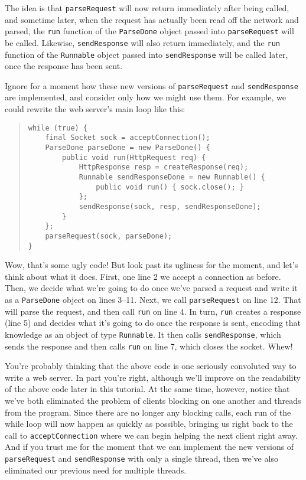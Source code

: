 \documentclass[11pt]{article}
\begin{document}
The idea is that \texttt{parseRequest} will now return immediately after
being called, and sometime later, when the request has actually been
read off the network and parsed, the \texttt{run} function of the
\texttt{ParseDone} object passed into \texttt{parseRequest} will be
called.  Likewise, \texttt{sendResponse} will also return immediately,
and the \texttt{run} function of the \texttt{Runnable} object passed
into \texttt{sendResponse} will be called later, once the response has
been sent.  

Ignore for a moment how these new versions of \texttt{parseRequest} and
\texttt{sendResponse} are implemented, and consider only how we might
use them.  For example, we could rewrite the web server's main loop like
this:

\begin{quote}
\lstset{language=Java, basicstyle=\small, numbers=left, numberstyle=\tiny, 
        numberfirstline=true, stepnumber=1, numbersep=5pt}
\begin{lstlisting}  
while (true) {
    final Socket sock = acceptConnection();
    ParseDone parseDone = new ParseDone() {
        public void run(HttpRequest req) {
            HttpResponse resp = createResponse(req);
            Runnable sendResponseDone = new Runnable() {
                public void run() { sock.close(); }
            };
            sendResponse(sock, resp, sendResponseDone);
        }
    };
    parseRequest(sock, parseDone);
}
\end{lstlisting}
\end{quote}

Wow, that's some ugly code!  But look past its ugliness for the moment,
and let's think about what it does.  First, one line 2 we accept a
connection as before.  Then, we decide what we're going to do once we've
parsed a request and write it as a \texttt{ParseDone} object on lines
3--11.  Next, we call \texttt{parseRequest} on line 12.  That will parse
the request, and then call \texttt{run} on line 4.  In turn,
\texttt{run} creates a response (line 5) and decides what it's going to
do once the response is sent, encoding that knowledge as an object of
type \texttt{Runnable}.  It then calls \texttt{sendResponse}, which
sends the response and then calls \texttt{run} on line 7, which closes
the socket.  Whew!

You're probably thinking that the above code is one seriously convoluted
way to write a web server.  In part you're right, although we'll
improve on the readability of the above code later in this tutorial.  At
the same time, however, notice that we've both eliminated the problem of
clients blocking on one another and threads from the program.  Since
there are no longer any blocking calls, each run of the while loop will
now happen as quickly as possible, bringing us right back to the call to
\texttt{acceptConnection} where we can begin helping the next client
right away.  And if you trust me for the moment that we can implement
the new versions of \texttt{parseRequest} and \texttt{sendResponse} with
only a single thread, then we've also eliminated our previous need for
multiple threads.
\end{document}
